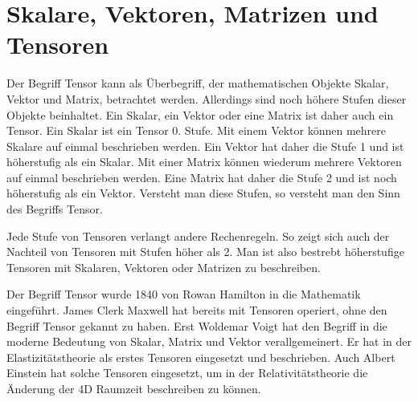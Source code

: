 \section{Skalare, Vektoren, Matrizen und Tensoren\label{spannung:section:Skalare,_Vektoren,_Matrizen_und_Tensoren}}
Der Begriff Tensor kann als Überbegriff, der mathematischen Objekte Skalar, Vektor und Matrix, betrachtet werden.
Allerdings sind noch höhere Stufen dieser Objekte beinhaltet.
Ein Skalar, ein Vektor oder eine Matrix ist daher auch ein Tensor.
Ein Skalar ist ein Tensor 0. Stufe.
Mit einem Vektor können mehrere Skalare auf einmal beschrieben werden.
Ein Vektor hat daher die Stufe 1 und ist höherstufig als ein Skalar.
Mit einer Matrix können wiederum mehrere Vektoren auf einmal beschrieben werden.
Eine Matrix hat daher die Stufe 2 und ist noch höherstufig als ein Vektor.
Versteht man diese Stufen, so versteht man den Sinn des Begriffs Tensor.

Jede Stufe von Tensoren verlangt andere Rechenregeln.
So zeigt sich auch der Nachteil von Tensoren mit Stufen höher als 2.
Man ist also bestrebt höherstufige Tensoren mit Skalaren, Vektoren oder Matrizen zu beschreiben.

Der Begriff Tensor wurde 1840 von Rowan Hamilton in die Mathematik eingeführt.
James Clerk Maxwell hat bereits mit Tensoren operiert, ohne den Begriff Tensor gekannt zu haben.
Erst Woldemar Voigt hat den Begriff in die moderne Bedeutung von Skalar, Matrix und Vektor verallgemeinert.
Er hat in der Elastizitätstheorie als erstes Tensoren eingesetzt und beschrieben.
Auch Albert Einstein hat solche Tensoren eingesetzt,
um in der Relativitätstheorie die Änderung der 4D Raumzeit beschreiben zu können.
\cite{spannung:Tensor}
\cite{spannung:Voigtsche Notation}